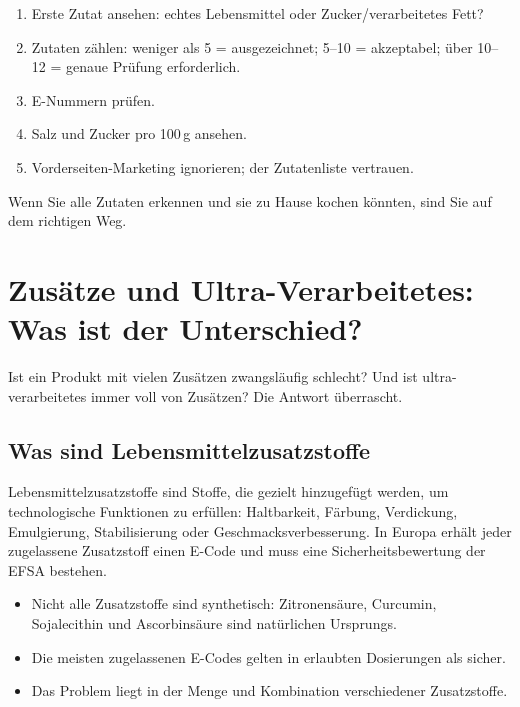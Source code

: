 \documentclass[a5paper,12pt,oneside,openany]{book}
\newcommand{\boxgruen}[2]{%
  \begin{tcolorbox}[kastenbase,
    colback=verdescuro!8!white, colframe=verdescuro, title={#1}]
  #2\end{tcolorbox}}
\begin{document}
\begin{enumerate}
  \item Erste Zutat ansehen: echtes Lebensmittel oder Zucker/verarbeitetes
    Fett?
  \item Zutaten z\"{a}hlen: weniger als 5 = ausgezeichnet; 5--10 = akzeptabel;
    \"{u}ber 10--12 = genaue Pr\"{u}fung erforderlich.
  \item E-Nummern pr\"{u}fen.
  \item Salz und Zucker pro 100\,g ansehen.
  \item Vorderseiten-Marketing ignorieren; der Zutatenliste vertrauen.
\end{enumerate}

\boxgruen{Abschlie{\ss}ender Rat}{Wenn Sie alle Zutaten erkennen und sie zu
Hause kochen k\"{o}nnten, sind Sie auf dem richtigen Weg.}

\chapter{Zus\"{a}tze und Ultra-Verarbeitetes: Was ist der Unterschied?}

Ist ein Produkt mit vielen Zus\"{a}tzen zwangsl\"{a}ufig schlecht? Und ist
ultra-verarbeitetes immer voll von Zus\"{a}tzen? Die Antwort \"{u}berrascht.

\section{Was sind Lebensmittelzusatzstoffe}

Lebensmittelzusatzstoffe sind Stoffe, die gezielt hinzugef\"{u}gt werden, um
technologische Funktionen zu erf\"{u}llen: Haltbarkeit, F\"{a}rbung,
Verdickung, Emulgierung, Stabilisierung oder Geschmacksverbesserung. In Europa
erh\"{a}lt jeder zugelassene Zusatzstoff einen E-Code und muss eine
Sicherheitsbewertung der EFSA bestehen.

\begin{itemize}
  \item Nicht alle Zusatzstoffe sind synthetisch: Zitronens\"{a}ure, Curcumin,
    Sojalecithin und Ascorbins\"{a}ure sind nat\"{u}rlichen Ursprungs.
  \item Die meisten zugelassenen E-Codes gelten in erlaubten Dosierungen
    als sicher.
  \item Das Problem liegt in der Menge und Kombination verschiedener
    Zusatzstoffe.
\end{itemize}
\end{document}
